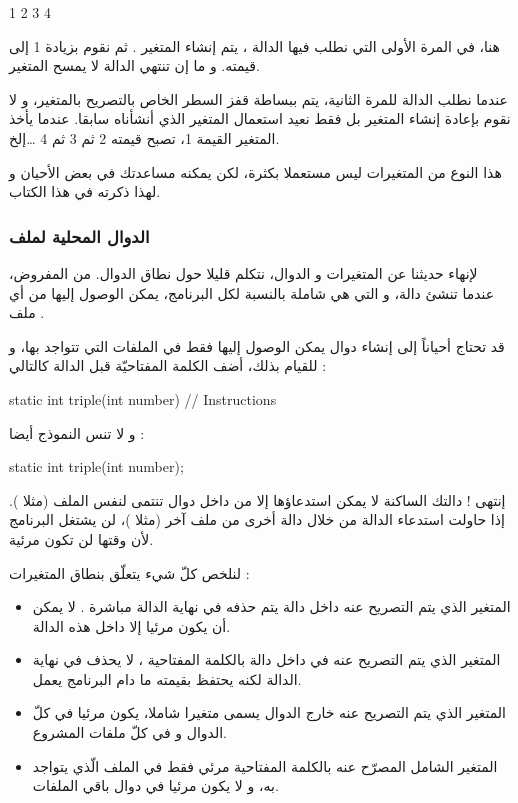 \begin{Console}
1
2
3
4
\end{Console}

هنا، في المرة الأولى التي نطلب فيها الدالة
،
يتم إنشاء المتغير
.
ثم نقوم بزيادة 1 إلى قيمته. و ما إن تنتهي الدالة لا يمسح المتغير.

عندما نطلب الدالة للمرة الثانية، يتم ببساطة قفز السطر الخاص بالتصريح بالمتغير، و لا نقوم بإعادة إنشاء المتغير بل فقط نعيد استعمال المتغير الذي أنشأناه سابقا. عندما يأخذ المتغير القيمة 1، تصبح قيمته 2 ثم 3 ثم 4 \dots إلخ.

هذا النوع من المتغيرات ليس مستعملا بكثرة، لكن يمكنه مساعدتك في بعض الأحيان و لهذا ذكرته في هذا الكتاب.

\subsubsection{الدوال المحلية لملف}

لإنهاء حديثنا عن المتغيرات و الدوال،  نتكلم قليلا حول نطاق الدوال. من المفروض، عندما تنشئ دالة، و التي هي شاملة بالنسبة لكل البرنامج، يمكن الوصول إليها من أي ملف
.

قد تحتاج أحياناً إلى إنشاء دوال يمكن الوصول إليها فقط في الملفات التي تتواجد بها، و للقيام بذلك، أضف الكلمة المفتاحيّة
قبل الدالة كالتالي :

\begin{Csource}
static int triple(int number)
{
	// Instructions
}
\end{Csource}

و لا تنس النموذج أيضا :

\begin{Csource}
static int triple(int number);
\end{Csource}

إنتهى ! دالتك الساكنة
لا يمكن استدعاؤها إلا من داخل دوال تنتمى لنفس الملف (مثلا
).
إذا حاولت استدعاء الدالة
من خلال دالة أخرى من ملف آخر (مثلا
)،
لن يشتغل البرنامج لأن
وقتها لن تكون مرئية.

لنلخص كلّ شيء يتعلّق بنطاق المتغيرات :

\begin{itemize}
  \item المتغير الذي يتم التصريح عنه داخل دالة يتم حذفه في نهاية الدالة مباشرة . لا يمكن أن يكون مرئيا إلا داخل هذه الدالة.
  \item المتغير الذي  يتم التصريح عنه في داخل دالة بالكلمة المفتاحية
،
لا يحذف في نهاية الدالة لكنه يحتفظ بقيمته ما دام البرنامج يعمل.
  \item المتغير الذي يتم التصريح عنه خارج الدوال يسمى متغيرا شاملا، يكون مرئيا في كلّ الدوال و في كلّ ملفات المشروع.
  \item  المتغير الشامل المصرّح عنه بالكلمة المفتاحية
مرئي فقط في الملف الّذي يتواجد به، و لا يكون مرئيا في دوال باقي الملفات.
\end{itemize}

